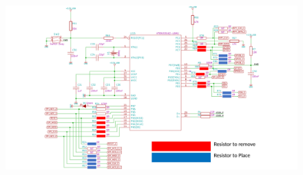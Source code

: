 \documentclass{article}
\begin{document}
  	\begin{figure}[h]
  		\begin{center}
		\includegraphics[scale=0.6]{zipper_microcontroller}
		\end{center}
	\end{figure}
	\label{fig:zipper_microcontroller}
	\pagebreak
\end{document}
